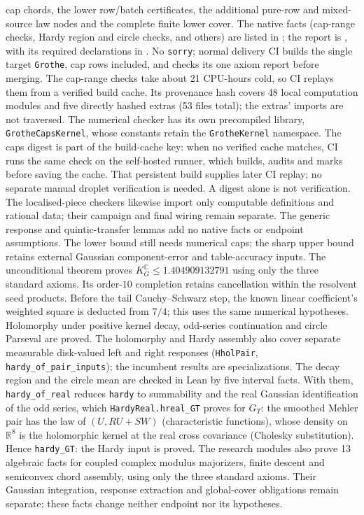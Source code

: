 \documentclass[11pt,a4paper]{article}
\newcommand{\C}{\mathbb{C}}
\newcommand{\KG}{K_G^{\C}}
\newcommand{\lean}[1]{\texttt{\small #1}}
\begin{document}
cap chords, the lower row/batch certificates, the additional pure-row and mixed-source law nodes and the complete finite lower cover.
The native facts (cap-range checks, Hardy region and circle checks, and others) are listed in ; the report is , with its required declarations in .
No \lean{sorry}; normal  delivery CI builds the single target \lean{Grothe}, cap rows included, and checks its one axiom report before merging.
The cap-range checks take about 21 CPU-hours cold, so CI replays them from a verified build cache.
Its provenance hash covers 48 local computation
modules and five directly hashed extras (53 files total); the extras' imports
are not traversed. The numerical checker has its own precompiled library,
\lean{GrotheCapsKernel}, whose constants retain the \lean{GrotheKernel} namespace.
The caps digest is part of the build-cache key: when no verified cache matches, CI runs the same check on
the self-hosted runner, which builds, audits and marks  before saving
the cache. That persistent build supplies later CI replay; no separate manual droplet verification is needed.
A digest alone is not verification. The localised-piece checkers
likewise import only computable definitions and rational data; their campaign
and final wiring remain separate. The generic response and
quintic-transfer lemmas add no native facts or endpoint assumptions. The lower bound still needs numerical caps;
the sharp upper bound retains external Gaussian component-error and table-accuracy inputs. The unconditional theorem proves $\KG\le1.404909132791$ using only the three standard axioms. Its order-$10$ completion retains cancellation within the resolvent seed products.
Before the tail Cauchy--Schwarz step, the known linear coefficient's weighted square is deducted from $7/4$; this uses the same numerical hypotheses.
Holomorphy under positive kernel decay, odd-series continuation and circle Parseval are proved.
The holomorphy and Hardy assembly also cover separate measurable disk-valued left and right responses
(\lean{HholPair}, \lean{hardy\_of\_pair\_inputs}); the incumbent results are specializations.
The decay region and the circle mean are checked in Lean by five interval facts. With them, \lean{hardy\_of\_real} reduces \lean{hardy}
to summability and the real Gaussian identification of the odd series, which \lean{HardyReal.hreal\_GT} proves for $G_T$:
the smoothed Mehler pair has the law of $(U, RU+SW)$ (characteristic functions), whose density on $\mathbb R^8$ is the
holomorphic kernel at the real cross covariance (Cholesky substitution). Hence \lean{hardy\_GT}: the Hardy input is proved.
The research modules also prove 13 algebraic facts for coupled complex modulus majorizers, finite descent and semiconvex chord
assembly, using only the three standard axioms. Their Gaussian integration, response extraction and global-cover
obligations remain separate; these facts change neither endpoint nor its hypotheses.
\end{document}
